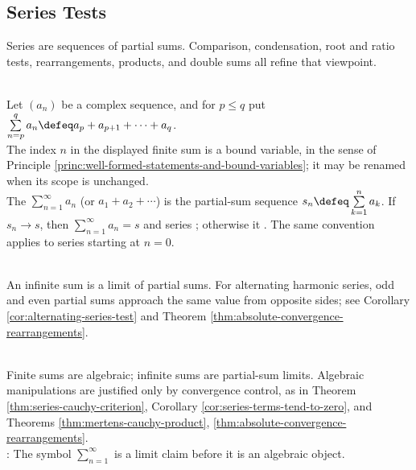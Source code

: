 \subsection{Series Tests}

%


Series are sequences of partial sums. Comparison, condensation, root and ratio tests, rearrangements, products, and double sums all refine that viewpoint.

\begin{definition} \label{def:series-core-definitions-source-todo}\label{def:series-and-partial-sums} \\
Let $(a_n)$ be a complex sequence, and for $p\leq q$ put $\sum\limits_{n=p}^{q}a_n\defeq a_p+a_{p+1}+\cdots+a_q$.\\
The index $n$ in the displayed finite sum is a bound variable, in the sense of Principle \ref{princ:well-formed-statements-and-bound-variables}; it may be renamed when its scope is unchanged.\\
The  $\sum_{n=1}^{\infty}a_n$ (or $a_1+a_2+\cdots$) is the partial-sum sequence $s_n\defeq\sum\limits_{k=1}^{n}a_k$. If $s_n\to s$, then $\sum\limits_{n=1}^{\infty}a_n=s$ and series ; otherwise it . The same convention applies to series starting at $n=0$.
\end{definition}


\begin{motivation} \label{mot:partial-sums-remember-order} \\
An infinite sum is a limit of partial sums. For alternating harmonic series, odd and even partial sums approach the same value from opposite sides; see Corollary \ref{cor:alternating-series-test} and Theorem \ref{thm:absolute-convergence-rearrangements}.
\end{motivation}

\begin{perspective} \label{per:formal-series-algebra-needs-convergence} \\
Finite sums are algebraic; infinite sums are partial-sum limits. Algebraic manipulations are justified only by convergence control, as in Theorem \ref{thm:series-cauchy-criterion}, Corollary \ref{cor:series-terms-tend-to-zero}, and Theorems \ref{thm:mertens-cauchy-product}, \ref{thm:absolute-convergence-rearrangements}.\\
: The symbol $\sum_{n=1}^{\infty}$ is a limit claim before it is an algebraic object.
\end{perspective}

